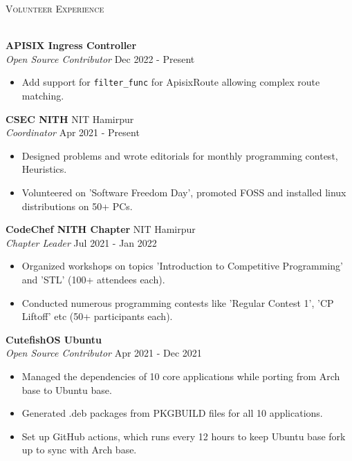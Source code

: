 \documentclass[a4paper]{article}
\newcommand{\lineunder} {
    \vspace*{-8pt} \\
    \hspace*{-18pt} \hrulefill \\
}
\newcommand{\header} [1] {
    {\hspace*{-18pt}\vspace*{6pt} \textsc{#1}}
    \vspace*{-6pt} \lineunder
}
\begin{document}

\header{Volunteer Experience}
\vspace{1mm}

\textbf{APISIX Ingress Controller}\\
\textit{Open Source Contributor} \hfill Dec 2022 - Present\\
\begin{itemize}
	\item Add support for \texttt{filter\_func} for ApisixRoute allowing complex route matching.
\end{itemize}
\vspace{1.5mm}

\textbf{CSEC NITH} \hfill NIT Hamirpur\\
\textit{Coordinator} \hfill Apr 2021 - Present\\
\begin{itemize}
	\item Designed problems and wrote editorials for monthly programming contest, Heuristics.
	\item Volunteered on 'Software Freedom Day', promoted FOSS and installed linux distributions on 50+ PCs.
\end{itemize}
\vspace{1.5mm}

\textbf{CodeChef NITH Chapter} \hfill NIT Hamirpur\\
\textit{Chapter Leader} \hfill Jul 2021 - Jan 2022\\
\begin{itemize}
	\item Organized workshops on topics 'Introduction to Competitive Programming' and 'STL' (100+ attendees each).
	\item Conducted numerous programming contests like 'Regular Contest 1', 'CP Liftoff' etc (50+ participants each).
\end{itemize}
\vspace{1.5mm}

\textbf{CutefishOS Ubuntu}\\
\textit{Open Source Contributor} \hfill Apr 2021 - Dec 2021\\
\begin{itemize}
	\item Managed the dependencies of 10 core applications while porting from Arch base to Ubuntu base.
	\item Generated .deb packages from PKGBUILD files for all 10 applications.
	\item Set up GitHub actions, which runs every 12 hours to keep Ubuntu base fork up to sync with Arch base.
\end{itemize}
\vspace{1.5mm}
\end{document}
